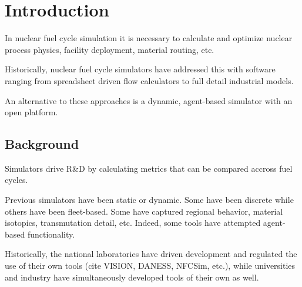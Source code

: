 
\section{Introduction}


In nuclear fuel cycle simulation it is necessary to calculate and optimize 
nuclear process physics, facility deployment, material routing, etc. 

Historically, nuclear fuel cycle simulators have addressed this with software 
ranging from spreadsheet driven flow calculators to full detail industrial 
models. 

An alternative to these approaches is a dynamic, agent-based simulator with an 
open platform.

\subsection{Background}



Simulators drive R\&D by calculating metrics that can be compared accross fuel 
cycles. 

Previous simulators have been static or dynamic. Some have been discrete while 
others have been fleet-based. Some have captured regional behavior, material 
isotopics, transmutation detail, etc. Indeed, some tools have attempted 
agent-based functionality.

Historically, the national laboratories have driven development and regulated 
the use of their own tools (cite VISION, DANESS, NFCSim, etc.), while 
universities and industry have simultaneously developed tools of their own as 
well. 

